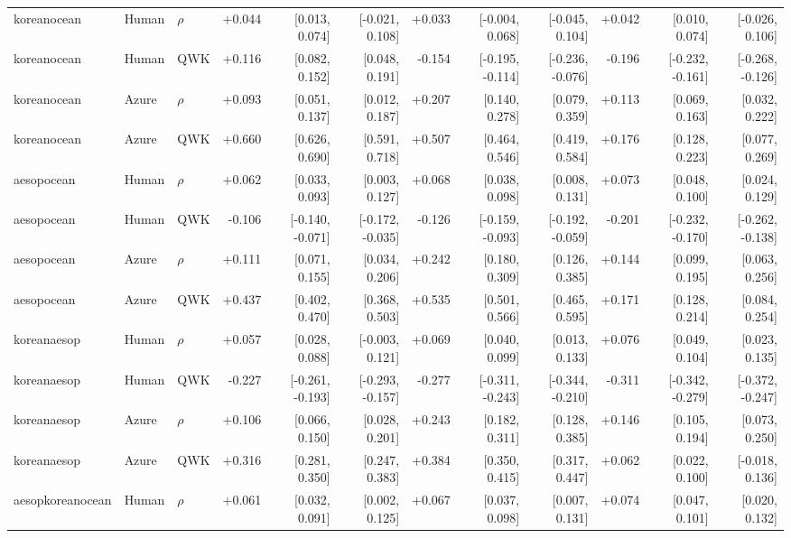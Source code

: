 \documentclass[10pt]{article}
\begin{document}
\begin{landscape}
\begin{longtable}{@{}lllrrrrrrrrr@{}}
\addlinespace[2pt]
koreanocean & Human & $\rho$ & +0.044 & [0.013, 0.074] & [-0.021, 0.108] & +0.033 & [-0.004, 0.068] & [-0.045, 0.104] & +0.042 & [0.010, 0.074] & [-0.026, 0.106]\\
koreanocean & Human & QWK & +0.116 & [0.082, 0.152] & [0.048, 0.191] & -0.154 & [-0.195, -0.114] & [-0.236, -0.076] & -0.196 & [-0.232, -0.161] & [-0.268, -0.126]\\
koreanocean & Azure & $\rho$ & +0.093 & [0.051, 0.137] & [0.012, 0.187] & +0.207 & [0.140, 0.278] & [0.079, 0.359] & +0.113 & [0.069, 0.163] & [0.032, 0.222]\\
koreanocean & Azure & QWK & +0.660 & [0.626, 0.690] & [0.591, 0.718] & +0.507 & [0.464, 0.546] & [0.419, 0.584] & +0.176 & [0.128, 0.223] & [0.077, 0.269]\\
\addlinespace[2pt]
aesopocean & Human & $\rho$ & +0.062 & [0.033, 0.093] & [0.003, 0.127] & +0.068 & [0.038, 0.098] & [0.008, 0.131] & +0.073 & [0.048, 0.100] & [0.024, 0.129]\\
aesopocean & Human & QWK & -0.106 & [-0.140, -0.071] & [-0.172, -0.035] & -0.126 & [-0.159, -0.093] & [-0.192, -0.059] & -0.201 & [-0.232, -0.170] & [-0.262, -0.138]\\
aesopocean & Azure & $\rho$ & +0.111 & [0.071, 0.155] & [0.034, 0.206] & +0.242 & [0.180, 0.309] & [0.126, 0.385] & +0.144 & [0.099, 0.195] & [0.063, 0.256]\\
aesopocean & Azure & QWK & +0.437 & [0.402, 0.470] & [0.368, 0.503] & +0.535 & [0.501, 0.566] & [0.465, 0.595] & +0.171 & [0.128, 0.214] & [0.084, 0.254]\\
\addlinespace[2pt]
koreanaesop & Human & $\rho$ & +0.057 & [0.028, 0.088] & [-0.003, 0.121] & +0.069 & [0.040, 0.099] & [0.013, 0.133] & +0.076 & [0.049, 0.104] & [0.023, 0.135]\\
koreanaesop & Human & QWK & -0.227 & [-0.261, -0.193] & [-0.293, -0.157] & -0.277 & [-0.311, -0.243] & [-0.344, -0.210] & -0.311 & [-0.342, -0.279] & [-0.372, -0.247]\\
koreanaesop & Azure & $\rho$ & +0.106 & [0.066, 0.150] & [0.028, 0.201] & +0.243 & [0.182, 0.311] & [0.128, 0.385] & +0.146 & [0.105, 0.194] & [0.073, 0.250]\\
koreanaesop & Azure & QWK & +0.316 & [0.281, 0.350] & [0.247, 0.383] & +0.384 & [0.350, 0.415] & [0.317, 0.447] & +0.062 & [0.022, 0.100] & [-0.018, 0.136]\\
\addlinespace[2pt]
aesopkoreanocean & Human & $\rho$ & +0.061 & [0.032, 0.091] & [0.002, 0.125] & +0.067 & [0.037, 0.098] & [0.007, 0.131] & +0.074 & [0.047, 0.101] & [0.020, 0.132]\\

\end{longtable}
\end{landscape}
\end{document}
